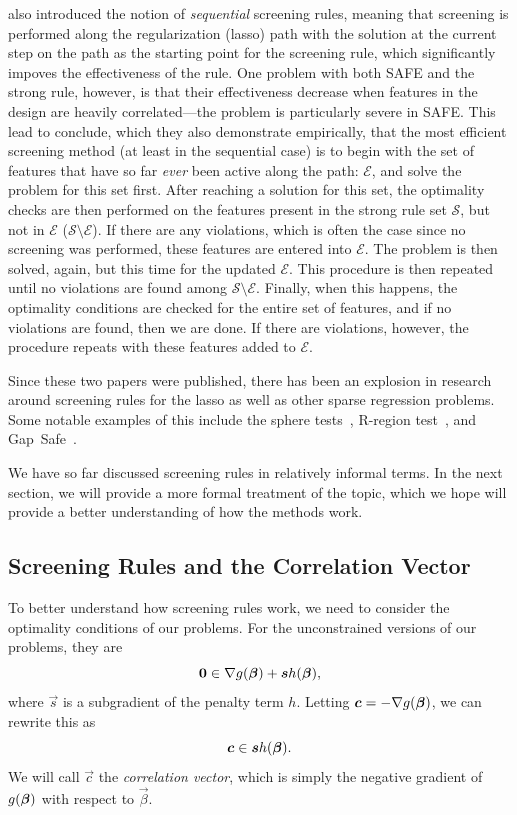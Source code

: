 \textcite{tibshirani2012} also introduced the notion of \emph{sequential} screening rules, meaning that screening is performed along the regularization (lasso) path with the solution at the current step on the path as the starting point for the screening rule, which significantly impoves the effectiveness of the rule. One problem with both SAFE and the strong rule, however, is that their effectiveness decrease when features in the design are heavily correlated---the problem is particularly severe in SAFE. This lead \textcite{tibshirani2012} to conclude, which they also demonstrate empirically, that the most efficient screening method (at least in the sequential case) is to begin with the set of features that have so far \emph{ever} been active along the path: \(\mathcal{E}\), and solve the problem for this set first. After reaching a solution for this set, the optimality checks are then performed on the features present in the strong rule set \(\mathcal{S}\), but not in \(\mathcal{E}\) (\(\mathcal{S} \setminus \mathcal{E}\)). If there are any violations, which is often the case since no screening was performed, these features are entered into \(\mathcal{E}\). The problem is then solved, again, but this time for the updated \(\mathcal{E}\). This procedure is then repeated until no violations are found among \(\mathcal{S} \setminus \mathcal{E}\). Finally, when this happens, the optimality conditions are checked for the entire set of features, and if no violations are found, then we are done. If there are violations, however, the procedure repeats with these features added to \(\mathcal{E}\).

Since these two papers were published, there has been an explosion in research around screening rules for the lasso as well as other sparse regression problems. Some notable examples of this include the sphere tests~\parencite{xiang2011}, R-region test~\parencite{xiang2012}, and
Gap~Safe~\parencite{fercoq2015,ndiaye2017}.

We have so far discussed screening rules in relatively informal terms. In the next section, we will provide a more formal treatment of the topic, which we hope will provide a better understanding of how the methods work.

\subsection{Screening Rules and the Correlation Vector}

To better understand how screening rules work, we need to consider the optimality conditions of our problems. For the unconstrained versions of our problems, they are
\begin{equation*}
  \boldsymbol{0} \in \nabla g(\boldsymbol{\beta}) + \boldsymbol{s} h(\boldsymbol{\beta}),
\end{equation*}
where \(\vec{s}\) is a subgradient of the penalty term \(h\). Letting \(\boldsymbol{c} = -\nabla g(\boldsymbol{\beta})\), we can rewrite this as
\begin{equation}
  \label{eq:kkt-check}
  \boldsymbol{c} \in \boldsymbol{s} h(\boldsymbol{\beta}).
\end{equation}
We will call \(\vec{c}\) the \emph{correlation vector}, which is simply the negative gradient of \(g(\boldsymbol{\beta})\) with respect to \(\vec{\beta}\).

